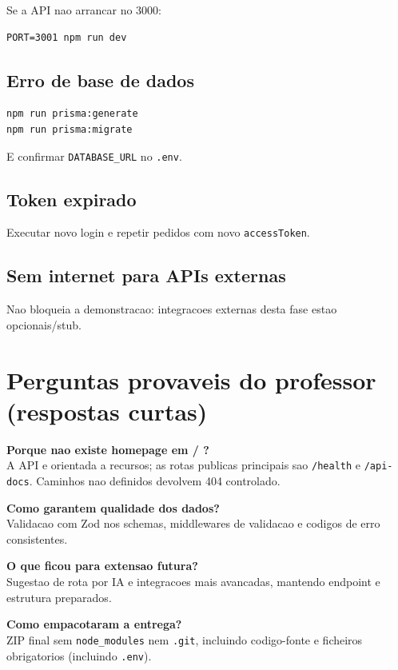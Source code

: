 \documentclass[11pt,a4paper]{article}
\begin{document}
Se a API nao arrancar no 3000:

\begin{verbatim}
PORT=3001 npm run dev
\end{verbatim}

\subsection{Erro de base de dados}

\begin{verbatim}
npm run prisma:generate
npm run prisma:migrate
\end{verbatim}

E confirmar \texttt{DATABASE\_URL} no \texttt{.env}.

\subsection{Token expirado}

Executar novo login e repetir pedidos com novo \texttt{accessToken}.

\subsection{Sem internet para APIs externas}

Nao bloqueia a demonstracao: integracoes externas desta fase estao opcionais/stub.

\section{Perguntas provaveis do professor (respostas curtas)}

\textbf{Porque nao existe homepage em / ?}\\
A API e orientada a recursos; as rotas publicas principais sao \texttt{/health} e \texttt{/api-docs}. Caminhos nao definidos devolvem 404 controlado.

\textbf{Como garantem qualidade dos dados?}\\
Validacao com Zod nos schemas, middlewares de validacao e codigos de erro consistentes.

\textbf{O que ficou para extensao futura?}\\
Sugestao de rota por IA e integracoes mais avancadas, mantendo endpoint e estrutura preparados.

\textbf{Como empacotaram a entrega?}\\
ZIP final sem \texttt{node\_modules} nem \texttt{.git}, incluindo codigo-fonte e ficheiros obrigatorios (incluindo \texttt{.env}).
\end{document}
